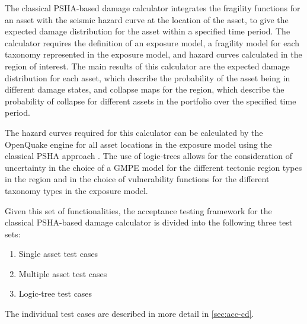 The classical PSHA-based damage calculator integrates the fragility functions for an asset with the seismic hazard curve at the location of the asset, to give the expected damage distribution for the asset within a specified time period. The calculator requires the definition of an exposure model, a fragility model for each taxonomy represented in the exposure model, and hazard curves calculated in the region of interest. The main results of this calculator are the expected damage distribution for each asset, which describe the probability of the asset being in different damage states, and collapse maps for the region, which describe the probability of collapse for different assets in the portfolio over the specified time period.

The hazard curves required for this calculator can be calculated by the OpenQuake engine for all asset locations in the exposure model using the classical PSHA approach \citep{cornell1968, mcguire1976}. The use of logic-trees allows for the consideration of uncertainty in the choice of a GMPE model for the different tectonic region types in the region and in the choice of vulnerability functions for the different taxonomy types in the exposure model.

Given this set of functionalities, the acceptance testing framework for the classical PSHA-based damage calculator is divided into the following three test sets:

\begin{enumerate}
	\item Single asset test cases
	\item Multiple asset test cases
	\item Logic-tree test cases
\end{enumerate}

The individual test cases are described in more detail in \ref{sec:acc-cd}.
